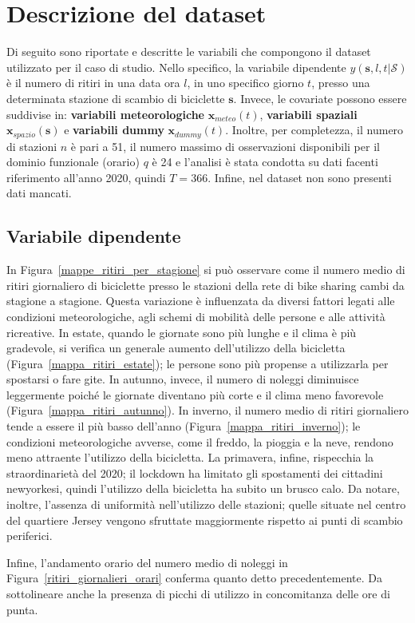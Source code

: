 \section[Descrizione del dataset]{Descrizione del dataset}
Di seguito sono riportate e descritte le variabili che compongono il dataset utilizzato per il caso di studio. Nello specifico, la variabile dipendente $y(\mathbf{s}, l, t|\mathcal{S})$ è il numero di ritiri in una data ora $l$, in uno specifico giorno $t$, presso una determinata stazione di scambio di biciclette $\mathbf{s}$. Invece, le covariate possono essere suddivise in: \textbf{variabili meteorologiche} $\mathbf{x}_{meteo}(t)$, \textbf{variabili spaziali} $\mathbf{x}_{spazio}(\mathbf{s})$ e \textbf{variabili dummy} $\mathbf{x}_{dummy}(t)$. Inoltre, per completezza, il numero di stazioni $n$ è pari a \num{51}, il numero massimo di osservazioni disponibili per il dominio funzionale (orario) $q$ è \num{24} e l'analisi è stata condotta su dati facenti riferimento all'anno \num{2020}, quindi $T=366$. Infine, nel dataset non sono presenti dati mancati.

\subsection[Numero di ritiri]{Variabile dipendente}
In Figura~\ref{mappe_ritiri_per_stagione} si può osservare come il numero medio di ritiri giornaliero di biciclette presso le stazioni della rete di bike sharing cambi da stagione a stagione. Questa variazione è influenzata da diversi fattori legati alle condizioni meteorologiche, agli schemi di mobilità delle persone e alle attività ricreative. In estate, quando le giornate sono più lunghe e il clima è più gradevole, si verifica un generale aumento dell'utilizzo della bicicletta (Figura~\ref{mappa_ritiri_estate}); le persone sono più propense a utilizzarla per spostarsi o fare gite. In autunno, invece, il numero di noleggi diminuisce leggermente poiché le giornate diventano più corte e il clima meno favorevole (Figura~\ref{mappa_ritiri_autunno}). In inverno, il numero medio di ritiri giornaliero tende a essere il più basso dell'anno (Figura~\ref{mappa_ritiri_inverno}); le condizioni meteorologiche avverse, come il freddo, la pioggia e la neve, rendono meno attraente l'utilizzo della bicicletta. La primavera, infine, rispecchia la straordinarietà del \num{2020}; il lockdown ha limitato gli spostamenti dei cittadini newyorkesi, quindi l'utilizzo della bicicletta ha subito un brusco calo. Da notare, inoltre, l'assenza di uniformità nell'utilizzo delle stazioni; quelle situate nel centro del quartiere Jersey vengono sfruttate maggiormente rispetto ai punti di scambio periferici.
\par Infine, l'andamento orario del numero medio di noleggi in Figura~\ref{ritiri_giornalieri_orari} conferma quanto detto precedentemente. Da sottolineare anche la presenza di picchi di utilizzo in concomitanza delle ore di punta.

